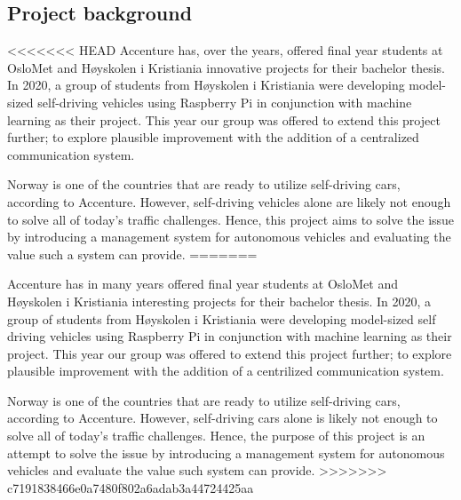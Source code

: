 \subsection{Project background}
<<<<<<< HEAD
Accenture has, over the years, offered final year students at OsloMet and Høyskolen i Kristiania innovative projects for their bachelor thesis. In 2020, a group of students from Høyskolen i Kristiania were developing model-sized self-driving vehicles using Raspberry Pi in conjunction with machine learning as their project. This year our group was offered to extend this project further; to explore plausible improvement with the addition of a centralized communication system.

Norway is one of the countries that are ready to utilize self-driving cars, according to Accenture. However, self-driving vehicles alone are likely not enough to solve all of today's traffic challenges. Hence, this project aims to solve the issue by introducing a management system for autonomous vehicles and evaluating the value such a system can provide.
=======
%
%

Accenture has in many years offered final year students at OsloMet and Høyskolen i Kristiania interesting projects for their bachelor thesis. In 2020, a group of students from Høyskolen i Kristiania were developing model-sized self driving vehicles using Raspberry Pi in conjunction with machine learning as their project. This year our group was offered to extend this project further; to explore plausible improvement with the addition of a centrilized communication system.

Norway is one of the countries that are ready to utilize self-driving cars, according to Accenture. However, self-driving cars alone is likely not enough to solve all of today's traffic challenges. Hence, the purpose of this project is an attempt to solve the issue by introducing a management system for autonomous vehicles and evaluate the value such system can provide.
>>>>>>> c7191838466e0a7480f802a6adab3a44724425aa
